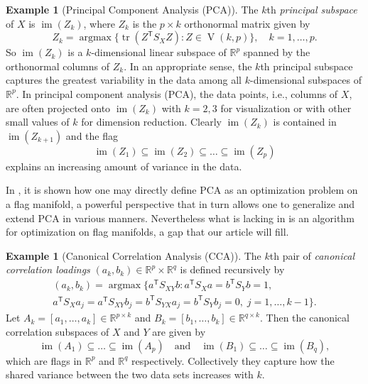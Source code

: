 \documentclass[11pt,reqno]{amsart}%
\theoremstyle{definition}
\newtheorem{example}[theorem]{Example}
\theoremstyle{remark}
\newcommand{\tp}{{\scriptscriptstyle\mathsf{T}}}
\DeclareMathOperator{\V}{V}
\DeclareMathOperator{\tr}{tr}
\DeclareMathOperator{\im}{im}
\DeclareMathOperator*{\argmax}{argmax}
\begin{document}
\begin{example}[Principal Component Analysis (PCA)]\label{eg:pca}
The $k$th \emph{principal subspace} of $X$ is $\im(Z_k)$, where $Z_k$ is the $p \times k$ orthonormal matrix given by
\begin{equation}\label{eq:pca}
Z_k = \argmax \{ \tr(Z^\tp S_X Z)  : Z \in \V(k,p)\}, \quad k =1,\dots, p.
\end{equation}
So  $\im(Z_k)$ is a $k$-dimensional linear subspace of $\mathbb{R}^p$ spanned by the orthonormal columns of $Z_k$. In an appropriate sense, the $k$th principal subspace captures the greatest variability in the data among all  $k$-dimensional subspaces of $\mathbb{R}^p$. In principal component analysis (PCA), the data points, i.e., columns of $X$, are often projected onto $\im(Z_k)$ with $k =2,3$ for visualization or with other small values of $k$ for dimension reduction. Clearly $\im(Z_k)$ is contained in $\im(Z_{k+1})$ and the flag
\[
\im(Z_1) \subseteq  \im(Z_2) \subseteq \dots \subseteq \im(Z_p)
\]
explains an increasing amount of variance in the data.
\end{example}
In \cite[Theorem~9]{PX}, it is shown how one may directly define PCA as an optimization problem on a flag manifold, a powerful perspective that in turn allows one to generalize and extend PCA in various manners. Nevertheless what is lacking in \cite{PX} is an algorithm for optimization on flag manifolds, a gap that our article will fill.

\begin{example}[Canonical Correlation Analysis (CCA)]\label{eg:cca}
The $k$th pair of \emph{canonical correlation loadings} $(a_k, b_k) \in \mathbb{R}^p \times \mathbb{R}^q$ is defined recursively by
\begin{multline}\label{eq:cca}
(a_k, b_k) = \argmax \{ a^\tp  S_{XY} b : a^\tp S_{X} a = b^\tp S_{Y} b = 1, \\
 a^\tp S_X a_j = a^\tp S_{XY} b_j = b^\tp S_{YX} a_j = b^\tp S_Y b_j = 0, \; j =1,\dots,k-1 \}.
\end{multline}
Let $A_k = [a_1,\dots,a_k] \in \mathbb{R}^{p \times k}$ and $B_k = [b_1,\dots,b_k] \in \mathbb{R}^{q \times k}$. Then the canonical correlation subspaces of $X$ and $Y$ are given by
\[
\im(A_1) \subseteq \dots \subseteq \im(A_p) \quad\text{and}\quad \im(B_1) \subseteq \dots \subseteq \im(B_q),
\]
which are flags in $\mathbb{R}^p$ and   $\mathbb{R}^q$ respectively. Collectively they capture how the  shared variance between the two data sets increases with $k$.
\end{example}
\end{document}
